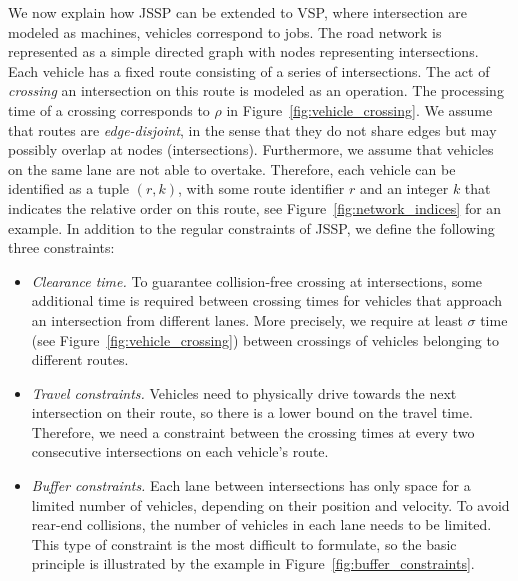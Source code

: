 \documentclass{article}
\theoremstyle{definition}
\theoremstyle{plain}
\begin{document}
We now explain how JSSP can be extended to VSP, where intersection are modeled
as machines, vehicles correspond to jobs.
The road network is represented as a simple directed graph with nodes
representing intersections. Each vehicle has a fixed route consisting of a
series of intersections. The act of \textit{crossing} an intersection on this
route is modeled as an operation. The processing time of a crossing corresponds
to $\rho$ in Figure~\ref{fig:vehicle_crossing}.
We assume that routes are \textit{edge-disjoint}, in the sense that they do not
share edges but may possibly overlap at nodes (intersections). Furthermore, we
assume that vehicles on the same lane are not able to overtake. Therefore, each
vehicle can be identified as a tuple $(r, k)$, with some route identifier $r$
and an integer $k$ that indicates the relative order on this route, see
Figure~\ref{fig:network_indices} for an example. In addition to the regular
constraints of JSSP, we define the following three constraints:

\begin{itemize}
  \item \textit{Clearance time.} To guarantee collision-free crossing at
        intersections, some additional time is required between crossing times
        for vehicles that approach an intersection from different lanes. More
        precisely, we require at least $\sigma$ time (see
        Figure~\ref{fig:vehicle_crossing}) between crossings of vehicles
        belonging to different routes.

  \item \textit{Travel constraints.} Vehicles need to physically drive towards
        the next intersection on their route, so there is a lower bound on
        the travel time. Therefore, we need a constraint between the crossing
        times at every two consecutive intersections on each vehicle's route.

  \item \textit{Buffer constraints.} Each lane between intersections has only
        space for a limited number of vehicles, depending on their position and
        velocity. To avoid rear-end collisions, the number of vehicles in each
        lane needs to be limited.
        This type of constraint is the most difficult to formulate, so the basic
        principle is illustrated by the example in
        Figure~\ref{fig:buffer_constraints}.
\end{itemize}
\end{document}
